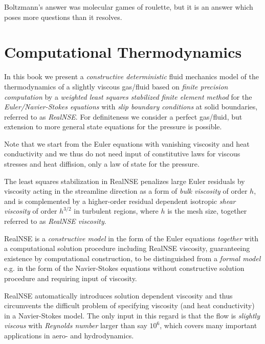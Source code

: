 Boltzmann's answer was molecular games of roulette, but it is an
answer which poses more questions than it resolves.  



\section{Computational Thermodynamics}   

In this book we present a \emph{constructive deterministic} fluid mechanics 
model of the thermodynamics of a slightly viscous gas/fluid  
based on \emph{finite precision computation} by
a \emph{weighted least squares stabilized finite element method} 
for the \emph{Euler/Navier-Stokes equations} with \emph{slip boundary conditions} at
solid boundaries, referred to
as \emph{RealNSE}. For definiteness
we consider a perfect gas/fluid, but extension to more general 
state equations for the pressure is possible.

Note that we start from the Euler equations with vanishing viscosity
and heat conductivity and we thus do not need input of constitutive laws 
for viscous stresses and heat diffision, only a law of state for the pressure.  

The least squares stabilization in RealNSE
penalizes large Euler residuals by viscosity acting in the 
streamline direction as a form of \emph{bulk viscosity} of order $h$,
and is complemented by a higher-order residual dependent isotropic \emph{shear 
viscosity} of order $h^{3/2}$ in turbulent regions, 
where $h$ is the mesh size, together referred to as \emph{RealNSE viscosity}. 

RealNSE is a \emph{constructive model} in the 
form of the Euler equations \emph{together} with a computational 
solution procedure including RealNSE viscosity, guaranteeing existence by computational
construction, 
to be distinguished from a \emph{formal model} e.g. in the form
of the Navier-Stokes equations without constructive solution procedure
and requiring input of viscosity.  

RealNSE automatically introduces 
solution dependent viscosity and thus circumvents the difficult 
problem of specifying viscosity (and heat conductivity) in a 
Navier-Stokes model.  The only input in this regard is that the 
flow is \emph{slightly viscous} with
\emph{Reynolds number} larger than say $10^6$, which
covers many important applications in aero- and hydrodynamics.  

